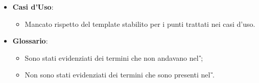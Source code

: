 \begin{itemize}
\begin{itemize}
  \end{itemize}
  
  \item\textbf{Casi d'Uso}:
  \begin{itemize}
	\item Mancato rispetto del template stabilito per i punti trattati nei casi d'uso.
  \end{itemize}

	\item\textbf{Glossario}:
	\begin{itemize}
		\item Sono stati evidenziati dei termini che non andavano nel \textit{\G{}};
		\item Non sono stati evidenziati dei termini che sono presenti nel \textit{\G{}}.
	\end{itemize}

\end{itemize}

